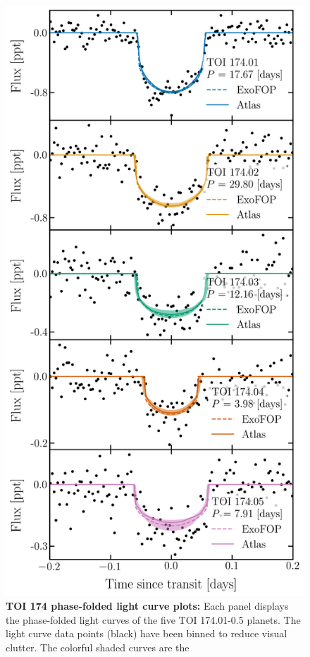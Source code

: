 \documentclass[floatfix,ApJL,twocolumn]{aastex631}
\begin{document}
\begin{figure}
    \includegraphics[width=0.9\linewidth]{paper/figures/toi_174_phase.png}
    \caption{\textbf{TOI 174 phase-folded light curve plots:} Each panel displays the phase-folded light curves of the five TOI 174.01-0.5 planets. 
    The light curve data points (black) have been binned to reduce visual clutter.
    The colorful shaded curves are the 
    }
    \label{fig:phase}
\end{figure}
\end{document}
